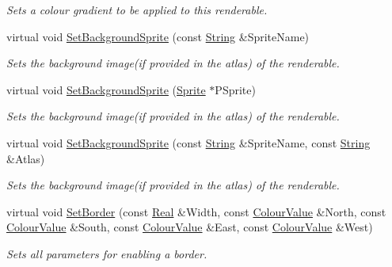 \begin{DoxyCompactItemize}
\begin{DoxyCompactList}\small\item\em Sets a colour gradient to be applied to this renderable. \item\end{DoxyCompactList}\item 
virtual void \hyperlink{classMezzanine_1_1UI_1_1Rectangle_a7022346cea3766eba2338f9304c20218}{SetBackgroundSprite} (const \hyperlink{namespaceMezzanine_acf9fcc130e6ebf08e3d8491aebcf1c86}{String} \&SpriteName)
\begin{DoxyCompactList}\small\item\em Sets the background image(if provided in the atlas) of the renderable. \item\end{DoxyCompactList}\item 
virtual void \hyperlink{classMezzanine_1_1UI_1_1Rectangle_a0e9e0664fd82258df48145cfe9d6000d}{SetBackgroundSprite} (\hyperlink{structMezzanine_1_1UI_1_1Sprite}{Sprite} $\ast$PSprite)
\begin{DoxyCompactList}\small\item\em Sets the background image(if provided in the atlas) of the renderable. \item\end{DoxyCompactList}\item 
virtual void \hyperlink{classMezzanine_1_1UI_1_1Rectangle_ad0814b6b4b13a4857b3bcaa163fd3210}{SetBackgroundSprite} (const \hyperlink{namespaceMezzanine_acf9fcc130e6ebf08e3d8491aebcf1c86}{String} \&SpriteName, const \hyperlink{namespaceMezzanine_acf9fcc130e6ebf08e3d8491aebcf1c86}{String} \&Atlas)
\begin{DoxyCompactList}\small\item\em Sets the background image(if provided in the atlas) of the renderable. \item\end{DoxyCompactList}\item 
virtual void \hyperlink{classMezzanine_1_1UI_1_1Rectangle_a631b89f63f524ede7d5e0a622058493d}{SetBorder} (const \hyperlink{namespaceMezzanine_a726731b1a7df72bf3583e4a97282c6f6}{Real} \&Width, const \hyperlink{classMezzanine_1_1ColourValue}{ColourValue} \&North, const \hyperlink{classMezzanine_1_1ColourValue}{ColourValue} \&South, const \hyperlink{classMezzanine_1_1ColourValue}{ColourValue} \&East, const \hyperlink{classMezzanine_1_1ColourValue}{ColourValue} \&West)
\begin{DoxyCompactList}\small\item\em Sets all parameters for enabling a border. \item\end{DoxyCompactList}\item 

\end{DoxyCompactItemize}
